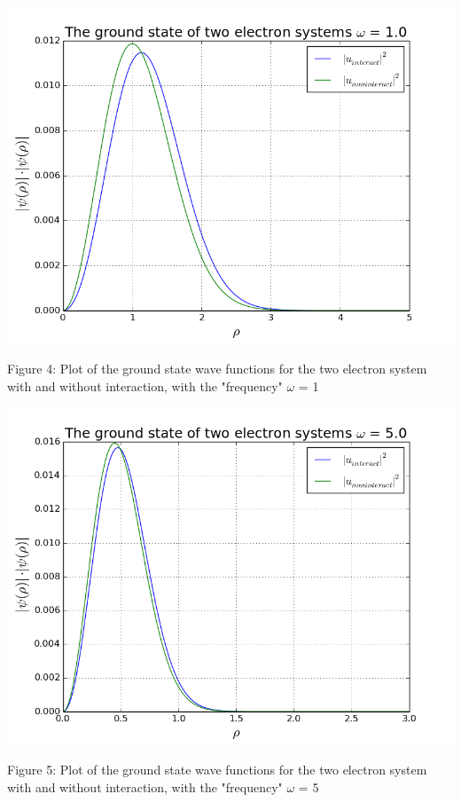\documentclass[norsk,a4paper,12pt]{article}
\begin{document}
\includegraphics[scale=0.65]{wavefunc_two_omega=1}\par
\vspace{1mm}
Figure 4: Plot of the ground state wave functions for the two electron system with and without interaction, with the "frequency" $\omega$ = 1
\par
\vspace{7mm}

\includegraphics[scale=0.6]{wavefunc_two_omega=5}\par
\vspace{1mm}
Figure 5:  Plot of the ground state wave functions for the two electron system with and without interaction, with the "frequency" $\omega$ = 5
\par
\vspace{7mm}
\end{document}
